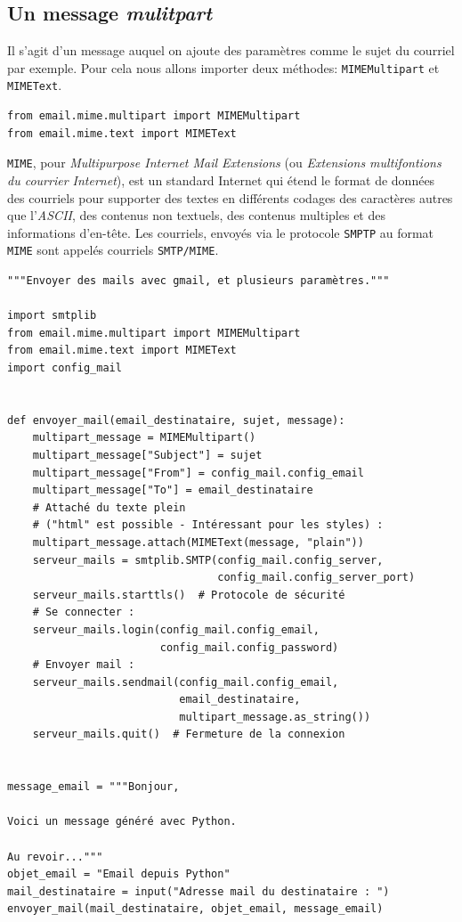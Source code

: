 \documentclass[a4paper,12pt]{book}
\begin{document}
\subsection*{Un message \textit{mulitpart}}
Il s'agit d'un message auquel on ajoute des paramètres comme le sujet du courriel par exemple. Pour cela nous allons importer deux méthodes: \texttt{MIMEMultipart} et \texttt{MIMEText}.
\begin{lstlisting}[caption=Importer \texttt{MIMEMultipart} et \texttt{MIMEText}]
from email.mime.multipart import MIMEMultipart
from email.mime.text import MIMEText
\end{lstlisting}
\medskip

\texttt{MIME}, pour \og \textit{Multipurpose Internet Mail Extensions}\fg{} (ou \textit{Extensions multifontions du courrier Internet}), est un standard Internet qui étend le format de données des courriels pour supporter des textes en différents codages des caractères autres que l'\textit{ASCII}, des contenus non textuels, des contenus multiples et des informations d'en-tête. Les courriels, envoyés via le protocole \texttt{SMPTP} au format \texttt{MIME} sont appelés courriels \texttt{SMTP/MIME}.
\begin{lstlisting}[caption=Un courriel avec divers paramètres (\textit{multipart})]
"""Envoyer des mails avec gmail, et plusieurs paramètres."""

import smtplib
from email.mime.multipart import MIMEMultipart
from email.mime.text import MIMEText
import config_mail


def envoyer_mail(email_destinataire, sujet, message):
    multipart_message = MIMEMultipart()
    multipart_message["Subject"] = sujet
    multipart_message["From"] = config_mail.config_email
    multipart_message["To"] = email_destinataire
    # Attaché du texte plein
    # ("html" est possible - Intéressant pour les styles) :
    multipart_message.attach(MIMEText(message, "plain"))
    serveur_mails = smtplib.SMTP(config_mail.config_server,
                                 config_mail.config_server_port)
    serveur_mails.starttls()  # Protocole de sécurité
    # Se connecter :
    serveur_mails.login(config_mail.config_email, 
                        config_mail.config_password)
    # Envoyer mail :
    serveur_mails.sendmail(config_mail.config_email, 
                           email_destinataire,
                           multipart_message.as_string())
    serveur_mails.quit()  # Fermeture de la connexion


message_email = """Bonjour,

Voici un message généré avec Python.

Au revoir..."""
objet_email = "Email depuis Python"
mail_destinataire = input("Adresse mail du destinataire : ")
envoyer_mail(mail_destinataire, objet_email, message_email)
\end{lstlisting}
\medskip
\end{document}
